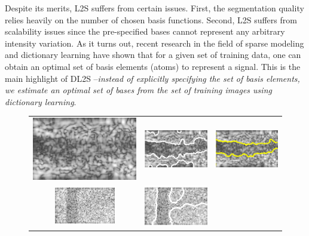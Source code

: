 Despite its merits, L2S suffers from certain issues. First, the segmentation quality relies heavily on the number of chosen basis functions. Second,  L2S suffers from scalability issues since the pre-specified bases cannot represent any arbitrary intensity variation. As it turns out, recent research in the field of sparse modeling and dictionary learning\cite{sparse_face,dl_algo,elad_denoising,dl_restoration,elad_ksvd} have shown that for a given set of training data, one can obtain an optimal set of basis elements (atoms) to represent a signal. This is the main highlight of DL2S --\emph{instead of explicitly specifying the set of basis elements, we estimate an optimal set of bases from the set of training images using dictionary learning}.
\begin{figure}[t]
\centering
	\renewcommand{\tabcolsep}{0.05cm}
	\renewcommand{\arraystretch}{0.05}
	\begin{tabular}{@{}ccc@{}}
		\includegraphics[width=.3\linewidth]{./images/DL2S/compare/vessINVIVO2_orig} &
		\includegraphics[width=.3\linewidth]{./images/DL2S/compare/vessINVIVO2_CV} &
		\includegraphics[width=.3\linewidth]{./images/DL2S/compare/vessINVIVO2_DL} 
		\\
		\includegraphics[width=.3\linewidth]{./images/DL2S/compare/imCyl2_orig} &		
		\includegraphics[width=.3\linewidth]{./images/DL2S/compare/imCyl2_CV} &

\end{tabular}
\end{figure}
